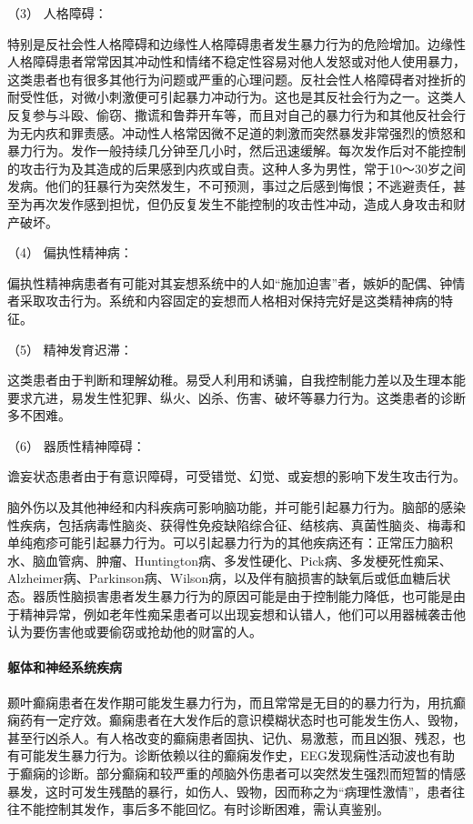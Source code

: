 \hypertarget{text00054.htmlux5cux23CHP1-18-12-2-1-3}{}
（3） 人格障碍：

特别是反社会性人格障碍和边缘性人格障碍患者发生暴力行为的危险增加。边缘性人格障碍患者常常因其冲动性和情绪不稳定性容易对他人发怒或对他人使用暴力，这类患者也有很多其他行为问题或严重的心理问题。反社会性人格障碍者对挫折的耐受性低，对微小刺激便可引起暴力冲动行为。这也是其反社会行为之一。这类人反复参与斗殴、偷窃、撒谎和鲁莽开车等，而且对自己的暴力行为和其他反社会行为无内疚和罪责感。冲动性人格常因微不足道的刺激而突然暴发非常强烈的愤怒和暴力行为。发作一般持续几分钟至几小时，然后迅速缓解。每次发作后对不能控制的攻击行为及其造成的后果感到内疚或自责。这种人多为男性，常于10～30岁之间发病。他们的狂暴行为突然发生，不可预测，事过之后感到悔恨；不逃避责任，甚至为再次发作感到担忧，但仍反复发生不能控制的攻击性冲动，造成人身攻击和财产破坏。

\hypertarget{text00054.htmlux5cux23CHP1-18-12-2-1-4}{}
（4） 偏执性精神病：

偏执性精神病患者有可能对其妄想系统中的人如“施加迫害”者，嫉妒的配偶、钟情者采取攻击行为。系统和内容固定的妄想而人格相对保持完好是这类精神病的特征。

\hypertarget{text00054.htmlux5cux23CHP1-18-12-2-1-5}{}
（5） 精神发育迟滞：

这类患者由于判断和理解幼稚。易受人利用和诱骗，自我控制能力差以及生理本能要求亢进，易发生性犯罪、纵火、凶杀、伤害、破坏等暴力行为。这类患者的诊断多不困难。

\hypertarget{text00054.htmlux5cux23CHP1-18-12-2-1-6}{}
（6） 器质性精神障碍：

谵妄状态患者由于有意识障碍，可受错觉、幻觉、或妄想的影响下发生攻击行为。

脑外伤以及其他神经和内科疾病可影响脑功能，并可能引起暴力行为。脑部的感染性疾病，包括病毒性脑炎、获得性免疫缺陷综合征、结核病、真菌性脑炎、梅毒和单纯疱疹可能引起暴力行为。可以引起暴力行为的其他疾病还有：正常压力脑积水、脑血管病、肿瘤、Huntington病、多发性硬化、Pick病、多发梗死性痴呆、Alzheimer病、Parkinson病、Wilson病，以及伴有脑损害的缺氧后或低血糖后状态。器质性脑损害患者发生暴力行为的原因可能是由于控制能力降低，也可能是由于精神异常，例如老年性痴呆患者可以出现妄想和认错人，他们可以用器械袭击他认为要伤害他或要偷窃或抢劫他的财富的人。

\paragraph{躯体和神经系统疾病}

颞叶癫痫患者在发作期可能发生暴力行为，而且常常是无目的的暴力行为，用抗癫痫药有一定疗效。癫痫患者在大发作后的意识模糊状态时也可能发生伤人、毁物，甚至行凶杀人。有人格改变的癫痫患者固执、记仇、易激惹，而且凶狠、残忍，也有可能发生暴力行为。诊断依赖以往的癫痫发作史，EEG发现痫性活动波也有助于癫痫的诊断。部分癫痫和较严重的颅脑外伤患者可以突然发生强烈而短暂的情感暴发，这时可发生残酷的暴行，如伤人、毁物，因而称之为“病理性激情”，患者往往不能控制其发作，事后多不能回忆。有时诊断困难，需认真鉴别。


